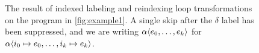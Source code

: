 \documentclass[submission,copyright,creativecommons]{eptcs}
\theoremstyle{definition}
\newcommand{\s}[1]{{\sf #1}}    \newcommand{\vc}[1]{{\bf #1}}
\newcommand{\ass}{\mathrel{:=}}
\def\lbl#1:{\mbox{\color{blue}$#1$}:}
\begin{document}
\begin{figure}[!ht]
\begin{minipage}{9.25cm}
\subcaption{}
\label{subfig:example1transformed}
\end{minipage}
\hfill{}
\caption{The result of indexed labeling and reindexing loop transformations on the
program in \autoref{fig:example1}. A single \s{skip} after the $\delta$ label has
been suppressed, and we are writing $\alpha\langle e_0, \ldots, e_k\rangle$ for
$\alpha\langle i_0\mapsto e_0, \ldots, i_k\mapsto e_k\rangle$.}
\end{figure}
\end{document}
